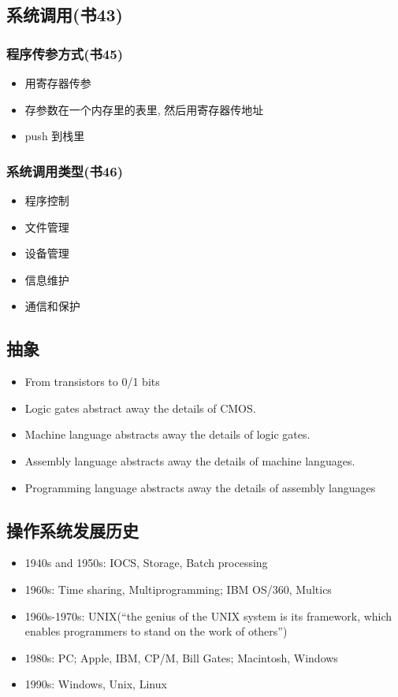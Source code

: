 \documentclass[a4paper, UTF8]{article}
\begin{document}
\subsection{系统调用(书43)}
\subsubsection{程序传参方式(书45)}
\begin{itemize}
\item 用寄存器传参
\item 存参数在一个内存里的表里, 然后用寄存器传地址
\item push 到栈里
\end{itemize}

\subsubsection{系统调用类型(书46)}
\begin{itemize}
\item 程序控制
\item 文件管理
\item 设备管理
\item 信息维护
\item 通信和保护
\end{itemize}

\subsection{抽象}
\begin{itemize}
\item From transistors to 0/1 bits
\item Logic gates abstract away the details of CMOS.
\item Machine language abstracts away the details of logic gates.
\item Assembly language abstracts away the details of machine languages.
\item Programming language abstracts away the details of assembly languages
\end{itemize}

\subsection{操作系统发展历史}
\begin{itemize}
\item 1940s and 1950s: IOCS, Storage, Batch processing
\item 1960s: Time sharing, Multiprogramming; IBM OS/360, Multics
\item 1960s-1970s: UNIX(“the genius of the UNIX system is its framework, which enables
programmers to stand on the work of others”)
\item 1980s: PC; Apple, IBM, CP/M, Bill Gates; Macintosh, Windows
\item 1990s: Windows, Unix, Linux
\end{itemize}
\end{document}
